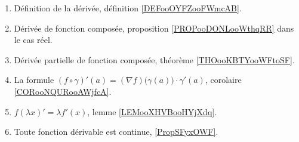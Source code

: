 	\label{THEMEooDerivation}
\begin{enumerate}
	\item
	      Définition de la dérivée, définition \ref{DEFooOYFZooFWmcAB}.
	\item
	      Dérivée de fonction composée, proposition \ref{PROPooDONLooWthqRR} dans le cas réel.
	\item
	      Dérivée partielle de fonction composée, théorème \ref{THOooKBTYooWFtoSF}.
	\item
	      La formule \( (f\circ \gamma)'(a)=(\nabla f)\big( \gamma(a) \big)\cdot \gamma'(a)\), corolaire \ref{CORooNQURooAWjfcA}.
	\item
	      \( f(\lambda x)'=\lambda f'(x)\), lemme \ref{LEMooXHVBooHYjXdq}.
	\item
	      Toute fonction dérivable est continue, \ref{PropSFyxOWF}.
\end{enumerate}
